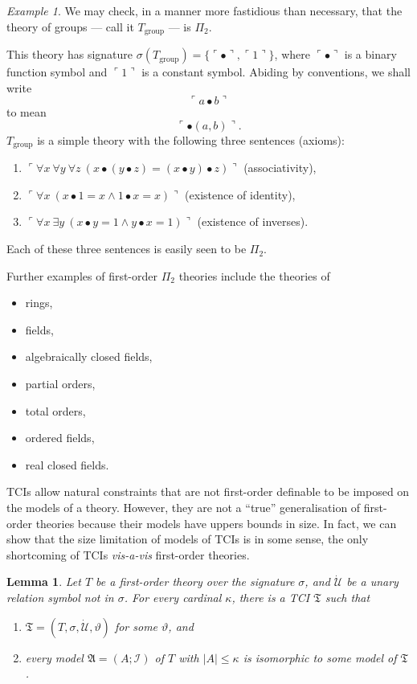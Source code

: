 \documentclass[12pt, twoside]{memoir}
\numberwithin{equation}{section}
\newtheorem{lem}[thm]{Lemma}
\theoremstyle{definition}
\theoremstyle{remark}
\newtheorem{ex}[thm]{Example}
\theoremstyle{definition}
\theoremstyle{definition}
\theoremstyle{definition}
\theoremstyle{remark}
\begin{document}
\begin{ex}
We may check, in a manner more fastidious than necessary, that the theory of groups --- call it $T_{\mathrm{group}}$ --- is $\Pi_2$.

This theory has signature $\sigma(T_{\mathrm{group}}) = \{\ulcorner \bullet \urcorner, \ulcorner 1 \urcorner\}$, where $\ulcorner \bullet \urcorner$ is a binary function symbol and $\ulcorner 1 \urcorner$ is a constant symbol. Abiding by conventions, we shall write $$\ulcorner a \bullet b \urcorner$$ to mean $$\ulcorner \bullet(a, b) \urcorner \text{.}$$ $T_{\mathrm{group}}$ is a simple theory with the following three sentences (axioms):
\begin{enumerate}[label=(\arabic*)]
    \item $\ulcorner \forall x \ \forall y \ \forall z \ (x \bullet (y \bullet z) = (x \bullet y) \bullet z) \urcorner$ (associativity),
    \item $\ulcorner \forall x \ (x \bullet 1 = x \wedge 1 \bullet x = x) \urcorner$ (existence of identity),
    \item $\ulcorner \forall x \ \exists y \ (x \bullet y = 1 \wedge y \bullet x = 1) \urcorner$ (existence of inverses).
\end{enumerate}
Each of these three sentences is easily seen to be $\Pi_2$.
\end{ex}

Further examples of first-order $\Pi_2$ theories include the theories of
\begin{itemize}
    \item rings,
    \item fields,
    \item algebraically closed fields,
    \item partial orders,
    \item total orders,
    \item ordered fields,
    \item real closed fields.
\end{itemize}

TCIs allow natural constraints that are not first-order definable to be imposed on the models of a theory. However, they are not a ``true'' generalisation of first-order theories because their models have uppers bounds in size. In fact, we can show that the size limitation of models of TCIs is in some sense, the only shortcoming of TCIs \emph{vis-a-vis} first-order theories. 

\begin{lem}\label{lem511}
Let $T$ be a first-order theory over the signature $\sigma$, and $\dot{\mathcal{U}}$ be a unary relation symbol not in $\sigma$. For every cardinal $\kappa$, there is a TCI $\mathfrak{T}$ such that 
\begin{enumerate}[label=(\alph*)]
    \item $\mathfrak{T} = (T, \sigma, \dot{\mathcal{U}}, \vartheta)$ for some $\vartheta$, and
    \item every model $\mathfrak{A} = (A; \mathcal{I})$ of $T$ with $|A| \leq \kappa$ is isomorphic to some model of $\mathfrak{T}$.
\end{enumerate}
\end{lem}
\end{document}

